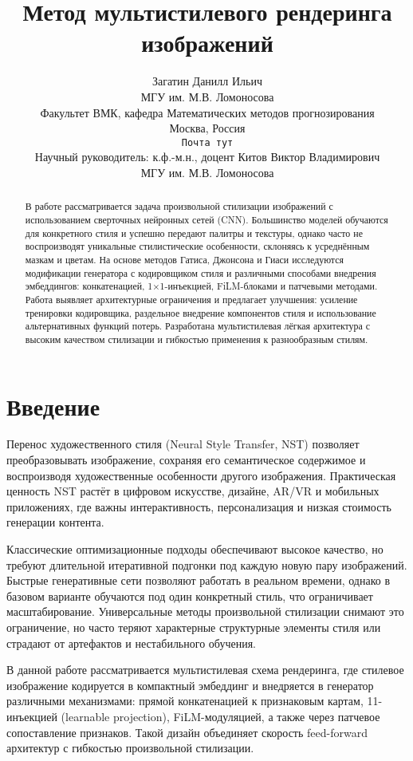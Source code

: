 \documentclass{article}
\title{Метод мультистилевого рендеринга изображений}
\author{
  Загатин Данилл Ильич \\
  МГУ им. М.В. Ломоносова \\
  Факультет ВМК, кафедра Математических методов прогнозирования \\
  Москва, Россия \\
  \texttt{Почта тут} \\
  \And
  Научный руководитель: к.ф.-м.н., доцент Китов Виктор Владимирович \\
  МГУ им. М.В. Ломоносова
}
\date{}
\begin{document}
\maketitle

\begin{abstract}
В работе рассматривается задача произвольной стилизации изображений с использованием сверточных нейронных сетей (CNN). Большинство моделей обучаются для конкретного стиля и успешно передают палитры и текстуры, однако часто не воспроизводят уникальные стилистические особенности, склоняясь к усреднённым мазкам и цветам. На основе методов Гатиса, Джонсона и Гиаси исследуются модификации генератора с кодировщиком стиля и различными способами внедрения эмбеддингов: конкатенацией, 1×1-инъекцией, FiLM-блоками и патчевыми методами. Работа выявляет архитектурные ограничения и предлагает улучшения: усиление тренировки кодировщика, раздельное внедрение компонентов стиля и использование альтернативных функций потерь. Разработана мультистилевая лёгкая архитектура с высоким качеством стилизации и гибкостью применения к разнообразным стилям.
\end{abstract}


\section{Введение}
Перенос художественного стиля (Neural Style Transfer, NST) позволяет преобразовывать изображение, сохраняя его семантическое содержимое и воспроизводя художественные особенности другого изображения. Практическая ценность NST растёт в цифровом искусстве, дизайне, AR/VR и мобильных приложениях, где важны интерактивность, персонализация и низкая стоимость генерации контента.

Классические оптимизационные подходы обеспечивают высокое качество, но требуют длительной итеративной подгонки под каждую новую пару изображений. Быстрые генеративные сети позволяют работать в реальном времени, однако в базовом варианте обучаются под один конкретный стиль, что ограничивает масштабирование. Универсальные методы произвольной стилизации снимают это ограничение, но часто теряют характерные структурные элементы стиля или страдают от артефактов и нестабильного обучения.

В данной работе рассматривается мультистилевая схема рендеринга, где стилевое изображение кодируется в компактный эмбеддинг и внедряется в генератор различными механизмами: прямой конкатенацией к признаковым картам, 1{\texttimes}1-инъекцией (learnable projection), FiLM-модуляцией, а также через патчевое сопоставление признаков. Такой дизайн объединяет скорость feed-forward архитектур с гибкостью произвольной стилизации.
\end{document}
